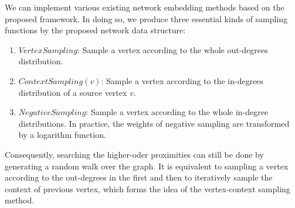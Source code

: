 We can implement various existing network embedding methods based on the proposed framework. In doing so, we produce three essential kinds of sampling functions by the proposed network data structure:
\begin{enumerate}
  \item $VertexSampling$: Sample a vertex according to the whole out-degrees distribution.
  \item $ContextSampling(v)$: Sample a vertex according to the in-degrees distribution of a source vertex $v$.
  \item $NegativeSampling$: Sample a vertex according to the whole in-degree distributions. In practice, the weights of negative sampling are transformed by a logarithm function.
\end{enumerate}
Consequently, searching the higher-oder proximities can still be done by generating a random walk over the graph.  It is equivalent to sampling a vertex according to the out-degrees in the first and then to iteratively sample the context of previous vertex, which forms the idea of the vertex-context sampling method.





